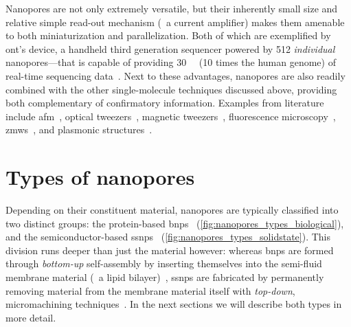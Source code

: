 Nanopores are not only extremely versatile, but their inherently small size and relative simple read-out
mechanism (\ie~a current amplifier) makes them amenable to both miniaturization and parallelization. Both of
which are exemplified by \gls{ont}'s  device, a handheld third generation sequencer powered by
\num{512} \emph{individual} nanopores---that is capable of providing \SI{30}{\giga\bp} (10 times the human
genome) of real-time sequencing data~\cite{ONT-2020}. Next to these advantages, nanopores are also readily
combined with the other single-molecule techniques discussed above, providing both complementary of
confirmatory information. Examples from literature include \gls{afm}~\cite{Aramesh-2019}, optical
tweezers~\cite{Keyser-2006,vanDorp-2009,Hall-2009,Galla-2014}, magnetic tweezers~\cite{Peng-2009},
fluorescence microscopy~\cite{McNally-2010,Anderson-2014,Assad-2014,Huang-2015},
\glspl{zmw}~\cite{Auger-2014,Larkin-2017,Spitzberg-2019}, and plasmonic
structures~\cite{Im-2010,Chen-2018,Verschueren-2018,Garoli-2019}.


%
%
\section{Types of nanopores}
%
\label{sec:np:types}
%

Depending on their constituent material, nanopores are typically classified into two distinct groups: the
protein-based \glspl{bnp}~\cite{Willems-VanMeervelt-2017} (\cref{fig:nanopores_types_biological}), and the
semiconductor-based \glspl{ssnp}~\cite{Dekker-2007} (\cref{fig:nanopores_types_solidstate}). This division
runs deeper than just the material however: whereas \glspl{bnp} are formed through \emph{bottom-up}
self-assembly by inserting themselves into the semi-fluid membrane material (\eg~a lipid
bilayer)~\cite{Howorka-2017}, \glspl{ssnp} are fabricated by permanently removing material from the membrane
material itself with \emph{top-down}, micromachining techniques~\cite{Dekker-2007}. In the next sections we
will describe both types in more detail.




